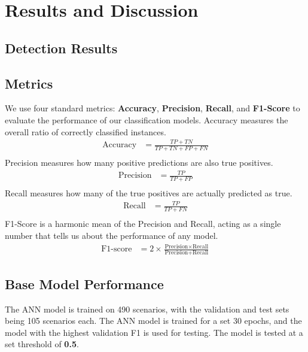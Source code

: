 \documentclass[final,5p,times,twocolumn,authoryear]{elsarticle}
\begin{document}
\section{Results and Discussion}

\subsection{Detection Results}

\subsection{Metrics}

We use four standard metrics: \textbf{Accuracy}, \textbf{Precision}, \textbf{Recall}, and \textbf{F1-Score} to evaluate the performance of our classification models.
\vspace{0.1cm}
\newline Accuracy measures the overall ratio of correctly classified instances.
\begin{align}
    \text{Accuracy} &= \frac{TP + TN}{TP + TN + FP + FN} \\[6pt]
\end{align}
\newline Precision measures how many positive predictions are also true positives.
\begin{align}
    \text{Precision} &= \frac{TP}{TP + FP} \\[6pt]
\end{align}
\newline Recall measures how many of the true positives are actually predicted as true.
\begin{align}
    \text{Recall} &= \frac{TP}{TP + FN} \\[6pt]
\end{align}
\newline F1-Score is a harmonic mean of the Precision and Recall, acting as a single number that tells us about the performance of any model.
\begin{align}
    \text{F1-score} &= 2 \times \frac{\text{Precision} \times \text{Recall}}{\text{Precision} + \text{Recall}}
\end{align}

\subsection{Base Model Performance}

The ANN model is trained on 490 scenarios, with the validation and test sets being 105 scenarios each. The ANN model is trained for a set 30 epochs, and the model with the highest validation F1 is used for testing. The model is tested at a set threshold of \textbf{0.5}.
\end{document}
